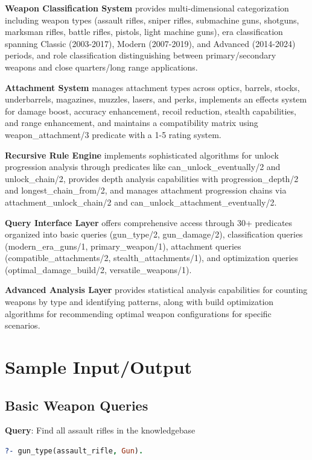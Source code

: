 \documentclass[12pt,a4paper]{article}
\begin{document}
\textbf{Weapon Classification System} provides multi-dimensional categorization including weapon types (assault rifles, sniper rifles, submachine guns, shotguns, marksman rifles, battle rifles, pistols, light machine guns), era classification spanning Classic (2003-2017), Modern (2007-2019), and Advanced (2014-2024) periods, and role classification distinguishing between primary/secondary weapons and close quarters/long range applications.

\textbf{Attachment System} manages attachment types across optics, barrels, stocks, underbarrels, magazines, muzzles, lasers, and perks, implements an effects system for damage boost, accuracy enhancement, recoil reduction, stealth capabilities, and range enhancement, and maintains a compatibility matrix using weapon\_attachment/3 predicate with a 1-5 rating system.

\textbf{Recursive Rule Engine} implements sophisticated algorithms for unlock progression analysis through predicates like can\_unlock\_eventually/2 and unlock\_chain/2, provides depth analysis capabilities with progression\_depth/2 and longest\_chain\_from/2, and manages attachment progression chains via attachment\_unlock\_chain/2 and can\_unlock\_attachment\_eventually/2.

\textbf{Query Interface Layer} offers comprehensive access through 30+ predicates organized into basic queries (gun\_type/2, gun\_damage/2), classification queries (modern\_era\_guns/1, primary\_weapon/1), attachment queries (compatible\_attachments/2, stealth\_attachments/1), and optimization queries (optimal\_damage\_build/2, versatile\_weapons/1).

\textbf{Advanced Analysis Layer} provides statistical analysis capabilities for counting weapons by type and identifying patterns, along with build optimization algorithms for recommending optimal weapon configurations for specific scenarios.

\section{Sample Input/Output}

\subsection{Basic Weapon Queries}

\textbf{Query}: Find all assault rifles in the knowledgebase
\begin{lstlisting}[language=Prolog]
?- gun_type(assault_rifle, Gun).
\end{lstlisting}
\end{document}
